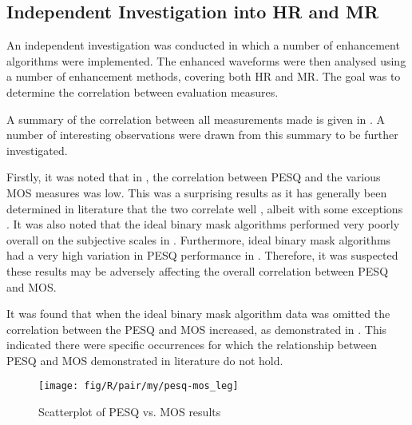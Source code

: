 \subsection{Independent Investigation into \acl{HR} and \acl{MR}}

An independent investigation was conducted in which a number of enhancement
algorithms were implemented. The enhanced waveforms were then analysed
using a number of enhancement methods, covering both \ac{HR} and
\ac{MR}. The goal was to determine the correlation between evaluation
measures.

A summary of the correlation between all measurements made is given
in . A number of interesting observations were drawn
from this summary to be further investigated.

Firstly, it was noted that in , the correlation between
\ac{PESQ} and the various \ac{MOS} measures was low. This was a
surprising results as it has generally been determined in literature
that the two correlate well \cite{Kitawaki2007,Rix2003,Rix2001},
albeit with some exceptions \cite{Liu2006}. It was also noted that
the ideal binary mask algorithms performed very poorly overall on
the subjective scales in .
Furthermore, ideal binary mask algorithms had a very high variation
in \ac{PESQ} performance in . Therefore, it was
suspected these results may be adversely affecting the overall correlation
between \ac{PESQ} and \ac{MOS}.

It was found that when the ideal binary mask algorithm data was omitted
the correlation between the \ac{PESQ} and \ac{MOS} increased, as
demonstrated in . This indicated there were specific
occurrences for which the relationship between \ac{PESQ} and \ac{MOS}
demonstrated in literature do not hold.

\begin{figure}[h]


\texttt{[image: fig/R/pair/my/pesq-mos\_leg]}

\protect\caption{\label{fig:my-pesq-mos}Scatterplot of \acs{PESQ} vs. \ac{MOS} results}
\end{figure}


